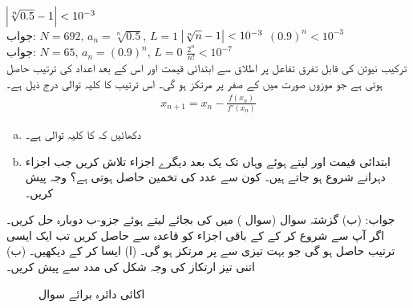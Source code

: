 $\abs{\sqrt[n]{0.5}-1}<10^{-3}$\\
جواب:\quad
$N=692,\, a_n=\sqrt[n]{0.5},\,L=1$
$\abs{\sqrt[n]{n}-1}<10^{-3}$
$(0.9)^n<10^{-3}$\\
جواب:\quad
$N=65,\, a_n=(0.9)^n,\, L=0$
$\frac{2^n}{n!}<10^{-7}$
\\
ترکیب نیوٹن کی قابل تفرق تفاعل  پر اطلاق  سے ابتدائی قیمت  اور اس کے بعد اعداد کی ترتیب  حاصل ہوتی ہے جو موزوں صورت میں  کے صفر پر مرتکز ہو گی۔ اس ترتیب کا کلیہ توالی درج ذیل ہے۔
\begin{align*}
x_{n+1}=x_n-\frac{f(x_n)}{f'(x_n)}
\end{align*}
\begin{enumerate}[a.]
\item
دکھائیں کہ  کا کلیہ توالی  ہے۔
\item
ابتدائی قیمت  اور  لیتے ہوئے وہاں تک یک بعد دیگرے اجزاء تلاش کریں جب اجزاء دہرانے شروع ہو جاتے ہیں۔ کون سے عدد کی تخمین حاصل ہوتی ہے؟ وجہ پیش کریں۔ 
\end{enumerate}
جواب:\quad
(ب) 
گزشتہ سوال (سوال ) میں  کی بجائے  لیتے ہوئے جزو-ب دوبارہ حل کریں۔
\\
اگر آپ  سے شروع کر کے   کے باقی اجزاء کو قاعدہ  سے حاصل کریں تب ایک ایسی ترتیب حاصل ہو گی جو بہت تیزی سے  پر مرتکز ہو گی۔ (ا) ایسا کر کے دیکھیں۔ (ب) اتنی تیز ارتکاز کی وجہ شکل  کی مدد سے پیش کریں۔
\begin{figure}
\centering
{}
\caption{اکائی دائرہ برائے سوال }
\label{شکل_سوال_تسلسل_پائے}
\end{figure}
